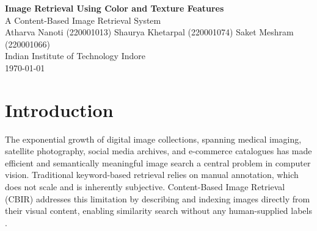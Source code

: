 \documentclass[12pt, a4paper]{article}
\begin{document}
\begin{titlepage}
    \centering
    \vspace*{2cm}
    {\LARGE \textbf{Image Retrieval Using Color and Texture Features}}\\[1em]
    {\large A Content-Based Image Retrieval System}\\[2.5em]

    {\normalsize
        Atharva Nanoti (220001013) \quad
        Shaurya Khetarpal (220001074) \quad
        Saket Meshram (220001066)
    }\\[0.5em]
    {\small Indian Institute of Technology Indore}\\[2em]
    {\small \today}\\[2em]

    \begin{abstract}
        \noindent
        This report presents the design and evaluation of a Content-Based Image Retrieval
        (CBIR) system that retrieves visually similar images purely from their pixel-level
        content. Three categories of hand-crafted visual descriptors are implemented: a
        3-channel color histogram, an optimized Local Binary Pattern (LBP) descriptor, and
        statistical features derived from the Gray-Level Co-occurrence Matrix (GLCM).
        All combinations of these descriptors are also evaluated as fused feature vectors.
        Retrieval performance is measured via Precision@$K$ ($K \in \{1,5,10,20\}$) on the
        Wang dataset (1000 images, 10 classes), using every image as a query in a
        leave-one-out protocol. Results show that fusing all three descriptors achieves
        the best global Precision@10 of \textbf{0.6699}, a 7.9\% relative improvement
        over the color histogram alone, while also outperforming every single-descriptor
        baseline.
    \end{abstract}
\end{titlepage}

\section{Introduction}

The exponential growth of digital image collections, spanning medical imaging, satellite
photography, social media archives, and e-commerce catalogues has made efficient and
semantically meaningful image search a central problem in computer vision. Traditional
keyword-based retrieval relies on manual annotation, which does not scale and is inherently
subjective. Content-Based Image Retrieval (CBIR) addresses this limitation by describing and
indexing images directly from their visual content, enabling similarity search without any
human-supplied labels \cite{smeulders2000}.
\end{document}
